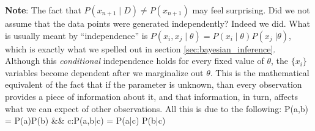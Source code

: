 \begin{footnotesize}
{\bf Note}: The fact that $P(x_{n+1}\;|\;D) \neq P(x_{n+1})$ may feel surprising. Did we not assume that the data points were generated independently? Indeed we did. What is usually meant by ``independence'' is $P(x_i, x_j\;|\;\theta) = P(x_i\;|\;\theta) P(x_j\;|\theta)$, which is exactly what we spelled out in section \ref{sec:bayesian_inference}. Although this \emph{conditional} independence holds for every fixed value of $\theta$, the $\{x_i\}$ variables become dependent after we marginalize out $\theta$. This is the mathematical equivalent of the fact that if the parameter is unknown, than every observation provides a piece of information about it, and that information, in turn, affects what we can expect of other observations. All this is due to the following:
\ba
	P(a,b) = P(a)P(b) &\quad \not\!\Leftrightarrow \quad& \forall c:\;P(a,b\;|\;c) = P(a\;|\;c) P(b\;|\;c)
\ea
\end{footnotesize}

\newpage
{}

